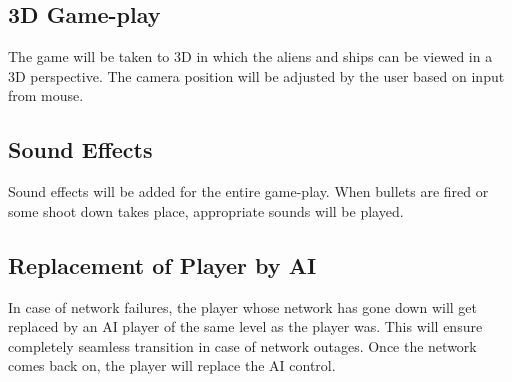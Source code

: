 \documentclass{article}
\begin{document}
		\subsection{3D Game-play}
			The game will be taken to 3D in which the aliens and ships can be viewed in a 3D perspective. The camera position will be adjusted by the user based on input from mouse.
		\subsection{Sound Effects}
			Sound effects will be added for the entire game-play. When bullets are fired or some shoot down takes place, appropriate sounds will be played.
		\subsection{Replacement of Player by AI}
			In case of network failures, the player whose network has gone down will get replaced by an AI player of the same level as the player was. This will ensure completely seamless transition in case of network outages. Once the network comes back on, the player will replace the AI control. 
\end{document}

